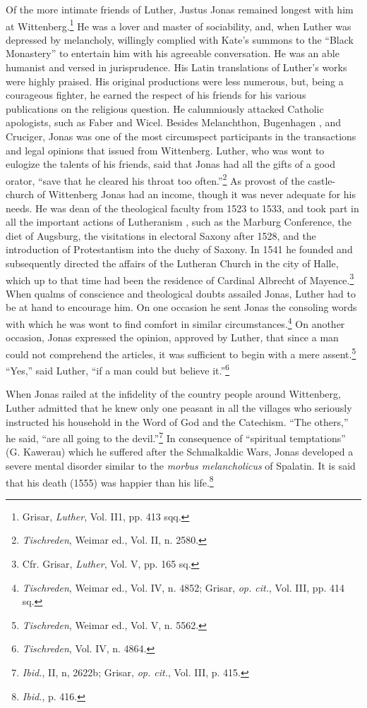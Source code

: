 Of the more intimate friends of Luther, Justus Jonas remained
longest with him at Wittenberg.\footnote{Grisar, \textit{Luther}, Vol. II1, pp. 413 sqq.}
 He was a lover and master of
sociability, and, when Luther was depressed by melancholy, willingly
complied with Kate’s summons to the “Black Monastery” to entertain
him with his agreeable conversation. He was an able humanist and
versed in jurisprudence. His Latin translations of Luther’s works
were highly praised. His original productions were less numerous, but,
being a courageous fighter, he earned the respect of his friends for his
various publications on the religious question. He calumniously attacked
Catholic apologists, such as Faber and Wicel. Besides Melanchthon, Bugenhagen
, and Cruciger, Jonas was one of the most
circumspect participants in the transactions and legal opinions that
issued from Wittenberg. Luther, who was wont to eulogize the
talents of his friends, said that Jonas had all the gifts of a good orator,
“save that he cleared his throat too often.”\footnote{\textit{Tischreden}, Weimar ed., Vol. II, n. 2580.}
 As provost of the castle-church
of Wittenberg Jonas had an income, though it was never
adequate for his needs. He was dean of the theological faculty from
1523 to 1533, and took part in all the important actions of Lutheranism
, such as the Marburg Conference, the diet of Augsburg, the
visitations in electoral Saxony after 1528, and the introduction of
Protestantism into the duchy of Saxony. In 1541 he founded and
subsequently directed the affairs of the Lutheran Church in the city
of Halle, which up to that time had been the residence of Cardinal
Albrecht of Mayence.\footnote{Cfr. Grisar, \textit{Luther}, Vol. V, pp. 165 sq.}
 When qualms of conscience and theological
doubts assailed Jonas, Luther had to be at hand to encourage him.
On one occasion he sent Jonas the consoling words with which he
was wont to find comfort in similar circumstances.\footnote
{\textit{Tischreden}, Weimar ed., Vol. IV, n. 4852; Grisar, \textit{op. cit.}, Vol. III, pp. 414 sq.}
On another occasion,
Jonas expressed the opinion, approved by Luther, that since a
man could not comprehend the articles, it was sufficient to begin with
a mere assent.\footnote{\textit{Tischreden}, Weimar ed., Vol. V, n. 5562.}
“Yes,” said Luther, “if a man could but believe it.”\footnote{\textit{Tischreden}, Vol. IV, n. 4864.}

When Jonas railed at the infidelity of the country people around
Wittenberg, Luther admitted that he knew only one peasant in all
the villages who seriously instructed his household in the Word of
God and the Catechism. “The others,” he said, “are all going to the
devil.”\footnote{\textit{Ibid.}, II, n, 2622b; Grisar, \textit{op. cit.}, Vol. III, p. 415.}
 In consequence of “spiritual temptations” (G. Kawerau)
which he suffered after the Schmalkaldic Wars, Jonas developed a
severe mental disorder similar to the \textit{morbus melancholicus} of
Spalatin. It is said that his death (1555) was happier than his life.\footnote{\textit{Ibid.}, p. 416.}

